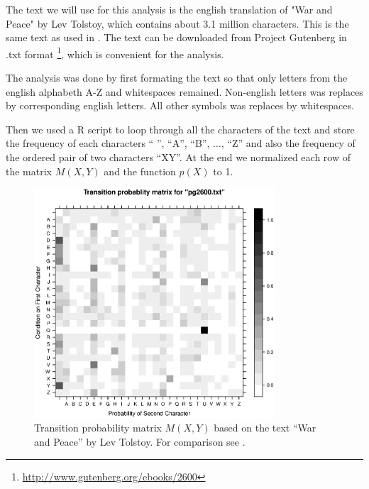 \documentclass[a4paper, 11pt]{article}
\begin{document}
The text we will use for this analysis is the english translation of 
"War and Peace" by Lev Tolstoy, which contains about 3.1 million characters. 
This is the same text as used in \cite{Landgraf}. The text can be downloaded
from Project Gutenberg in .txt format 
\footnote{\href{http://www.gutenberg.org/ebooks/2600}
{http://www.gutenberg.org/ebooks/2600}}, which is convenient for the analysis.

The analysis was done by first formating the text so that only letters from
the english alphabeth A-Z and whitespaces remained. Non-english letters was
replaces by corresponding english letters. All other symbols was replaces by
whitespaces.

Then we used a R script to loop through all the characters of the text
and store the frequency of each characters `` '', ``A'', ``B'', 
$\dots$, ``Z'' and also the frequency of the ordered pair of two 
characters ``XY''. At the end we normalized each row of the matrix $M(X,Y)$
and the function $p(X)$ to 1.

\begin{figure}[h]
  \centering
  \includegraphics[width=0.8\textwidth]{transprob_matrix-pg2600-.eps}
  \caption{Transition probability matrix $M(X,Y)$ based on the text
    ``War and Peace'' by Lev Tolstoy. For comparison see \cite{Landgraf}.}
  \label{fig:TransProbMat}
\end{figure}
\end{document}
